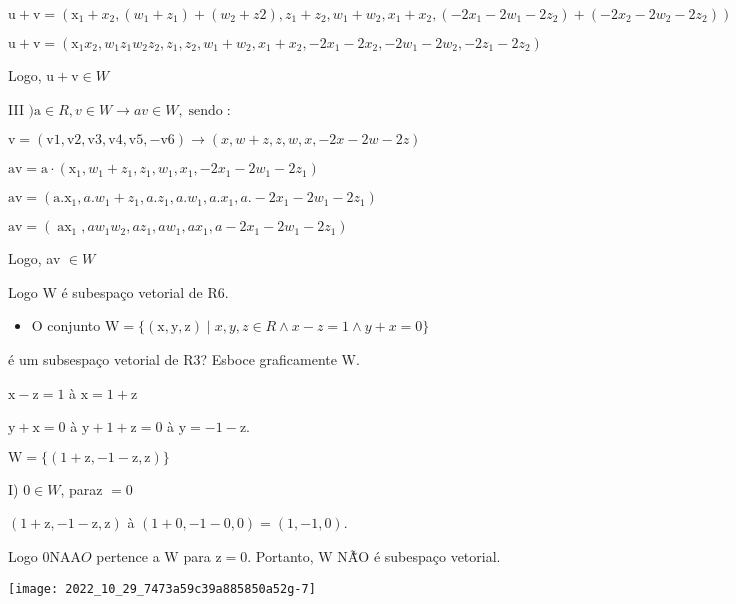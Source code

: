 \documentclass[10pt]{article}
\begin{document}
$\mathrm{u}+\mathrm{v}=\left(\mathrm{x}_{1}+x_{2},\left(w_{1}+z_{1}\right)+\left(w_{2}+z 2\right), z_{1}+z_{2}, w_{1}+w_{2}, x_{1}+x_{2},\left(-2 x_{1}-2 w_{1}-2 z_{2}\right)+\left(-2 x_{2}-2 w_{2}-2 z_{2}\right)\right)$

$\mathrm{u}+\mathrm{v}=\left(\mathrm{x}_{1} x_{2}, w_{1} z_{1} w_{2} z_{2}, z_{1}, z_{2}, w_{1}+w_{2}, x_{1}+x_{2},-2 x_{1}-2 x_{2},-2 w_{1}-2 w_{2},-2 z_{1}-2 z_{2}\right)$

Logo, $\mathrm{u}+\mathrm{v} \in W$

III $) \mathrm{a} \in R, v \in W \rightarrow a v \in W, \operatorname{sendo}:$

$\mathrm{v}=(\mathrm{v} 1, \mathrm{v} 2, \mathrm{v} 3, \mathrm{v} 4, \mathrm{v} 5,-\mathrm{v} 6) \rightarrow(x, w+z, z, w, x,-2 x-2 w-2 z)$

$\mathrm{av}=\mathrm{a} \cdot\left(\mathrm{x}_{1}, w_{1}+z_{1}, z_{1}, w_{1}, x_{1},-2 x_{1}-2 w_{1}-2 z_{1}\right)$

$\mathrm{av}=\left(\mathrm{a} . \mathrm{x}_{1}, a . w_{1}+z_{1}, a . z_{1}, a . w_{1}, a . x_{1}, a .-2 x_{1}-2 w_{1}-2 z_{1}\right)$

$\mathrm{av}=\left(\operatorname{ax}_{1}, a w_{1} w_{2}, a z_{1}, a w_{1}, a x_{1}, a-2 x_{1}-2 w_{1}-2 z_{1}\right)$

Logo, av $\in W$

Logo W é subespaço vetorial de R6.

\begin{itemize}
  \item $\mathrm{O}$ conjunto $\mathrm{W}=\{(\mathrm{x}, \mathrm{y}, \mathrm{z}) \mid x, y, z \in R \wedge x-z=1 \wedge y+x=0\}$
\end{itemize}
é um subsespaço vetorial de R3? Esboce graficamente W.

$\mathrm{x}-\mathrm{z}=1$ à $\mathrm{x}=1+\mathrm{z}$

$\mathrm{y}+\mathrm{x}=0$ à $\mathrm{y}+1+\mathrm{z}=0$ à $\mathrm{y}=-1-\mathrm{z}$.

$\mathrm{W}=\{(1+\mathrm{z},-1-\mathrm{z}, \mathrm{z})\}$

I) $0 \in W$, paraz $=0$

$(1+\mathrm{z},-1-\mathrm{z}, \mathrm{z})$ à $(1+0,-1-0,0)=(1,-1,0)$.

Logo $0 \mathrm{NA} \mathrm{A} O$ pertence a $\mathrm{W}$ para $\mathrm{z}=0$. Portanto, W NÃ̃O é subespaço vetorial.

\texttt{[image: 2022\_10\_29\_7473a59c39a885850a52g-7]}
\end{document}
